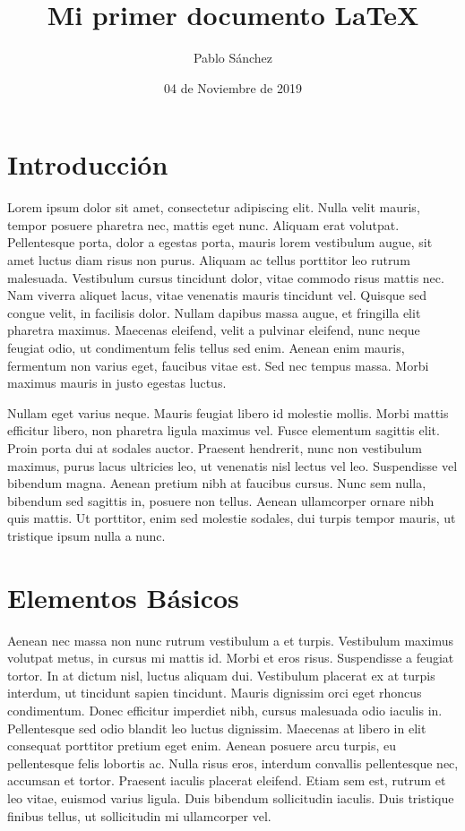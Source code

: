 \documentclass{article}
\title{Mi primer documento \LaTeX}
\author{Pablo Sánchez}
\date{04 de Noviembre de 2019}
\begin{document}
\maketitle

\section{Introducción}

Lorem ipsum dolor sit amet, consectetur adipiscing elit. Nulla velit mauris, tempor posuere pharetra nec, mattis eget nunc. Aliquam erat volutpat. Pellentesque porta, dolor a egestas porta, mauris lorem vestibulum augue, sit amet luctus diam risus non purus. Aliquam ac tellus porttitor leo rutrum malesuada. Vestibulum cursus tincidunt dolor, vitae commodo risus mattis nec. Nam viverra aliquet lacus, vitae venenatis mauris tincidunt vel. Quisque sed congue velit, in facilisis dolor. Nullam dapibus massa augue, et fringilla elit pharetra maximus. Maecenas eleifend, velit a pulvinar eleifend, nunc neque feugiat odio, ut condimentum felis tellus sed enim. Aenean enim mauris, fermentum non varius eget, faucibus vitae est. Sed nec tempus massa. Morbi maximus mauris in justo egestas luctus.

Nullam eget varius neque. Mauris feugiat libero id molestie mollis. Morbi mattis efficitur libero, non pharetra ligula maximus vel. Fusce elementum sagittis elit. Proin porta dui at sodales auctor. Praesent hendrerit, nunc non vestibulum maximus, purus lacus ultricies leo, ut venenatis nisl lectus vel leo. Suspendisse vel bibendum magna. Aenean pretium nibh at faucibus cursus. Nunc sem nulla, bibendum sed sagittis in, posuere non tellus. Aenean ullamcorper ornare nibh quis mattis. Ut porttitor, enim sed molestie sodales, dui turpis tempor mauris, ut tristique ipsum nulla a nunc.

\section{Elementos Básicos}

Aenean nec massa non nunc rutrum vestibulum a et turpis. Vestibulum maximus volutpat metus, in cursus mi mattis id. Morbi et eros risus. Suspendisse a feugiat tortor. In at dictum nisl, luctus aliquam dui. Vestibulum placerat ex at turpis interdum, ut tincidunt sapien tincidunt. Mauris dignissim orci eget rhoncus condimentum. Donec efficitur imperdiet nibh, cursus malesuada odio iaculis in. Pellentesque sed odio blandit leo luctus dignissim. Maecenas at libero in elit consequat porttitor pretium eget enim. Aenean posuere arcu turpis, eu pellentesque felis lobortis ac. Nulla risus eros, interdum convallis pellentesque nec, accumsan et tortor. Praesent iaculis placerat eleifend. Etiam sem est, rutrum et leo vitae, euismod varius ligula. Duis bibendum sollicitudin iaculis. Duis tristique finibus tellus, ut sollicitudin mi ullamcorper vel.
\end{document}
